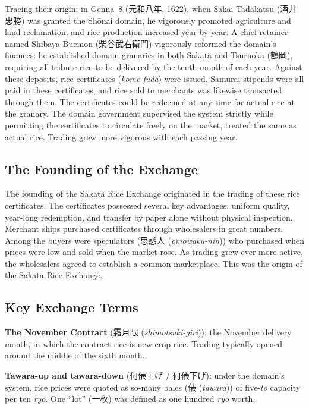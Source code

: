 \documentclass[10pt, openany]{book}
\newcommand{\jp}[1]{{\japanesefont #1}}
\newcommand{\jt}[2]{\jp{#1} (\textit{#2})}
\begin{document}
Tracing their origin: in Genna~8 (\jp{元和八年}, 1622), when Sakai
Tadakatsu (\jp{酒井忠勝}) was granted the Sh\=onai domain, he
vigorously promoted agriculture and land reclamation, and rice production
increased year by year. A chief retainer named Shibaya Buemon
(\jp{柴谷武右衛門}) vigorously reformed the domain's finances: he
established domain granaries in both Sakata and Tsuruoka (\jp{鶴岡}),
requiring all tribute rice to be delivered by the tenth month of each
year. Against these deposits, rice certificates (\textit{kome-fuda}) were
issued. Samurai stipends were all paid in these certificates, and rice
sold to merchants was likewise transacted through them. The certificates
could be redeemed at any time for actual rice at the granary. The domain
government supervised the system strictly while permitting the
certificates to circulate freely on the market, treated the same as
actual rice. Trading grew more vigorous with each passing year.

\subsection*{The Founding of the Exchange}

The founding of the Sakata Rice Exchange originated in the trading of
these rice certificates. The certificates possessed several key
advantages: uniform quality, year-long redemption, and transfer by paper
alone without physical inspection. Merchant ships purchased certificates
through wholesalers in great numbers. Among the buyers were speculators
(\jt{思惑人}{omowaku-nin}) who purchased when prices were low and sold
when the market rose. As trading grew ever more active, the wholesalers
agreed to establish a common marketplace. This was the origin of the
Sakata Rice Exchange.

\subsection*{Key Exchange Terms}

\textbf{The November Contract} (\jt{霜月限}{shimotsuki-giri}): the
November delivery month, in which the contract rice is new-crop rice.
Trading typically opened around the middle of the sixth month.

\textbf{Tawara-up and tawara-down} (\jp{何俵上げ / 何俵下げ}): under
the domain's system, rice prices were quoted as so-many bales
(\jt{俵}{tawara}) of five-\textit{to} capacity per ten \textit{ry\=o}.
One ``lot'' (\jp{一枚}) was defined as one hundred \textit{ry\=o} worth.
\end{document}
